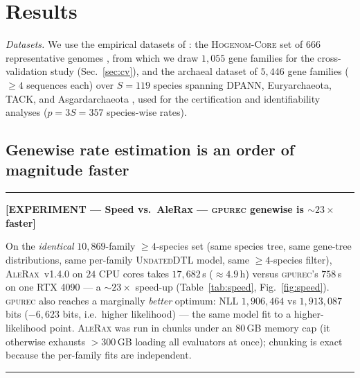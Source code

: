 \documentclass[11pt]{article}
\newcommand{\toolname}{\textsc{gpurec}\xspace}
\newenvironment{expbox}[1]{%
  \par\smallskip\noindent
  \begin{center}\begin{minipage}{0.96\linewidth}\small
  \rule{\linewidth}{0.8pt}\par
  \textbf{\color{red!60!black}[EXPERIMENT --- #1]}\par\itshape
}{%
  \par\rule{\linewidth}{0.8pt}
  \end{minipage}\end{center}\smallskip
}
\begin{document}
\section{Results}
\label{sec:results}

\noindent\emph{Datasets.} We use the empirical datasets of
\citet{Morel2024}: the \textsc{Hogenom-Core} set of $666$ representative
genomes \citep{Penel2009}, from which we draw $1{,}055$ gene families for the
cross-validation study (Sec.~\ref{sec:cv}), and the archaeal dataset of
$5{,}446$ gene families ($\geq\!4$ sequences each) over $S{=}119$ species
spanning DPANN, Euryarchaeota, TACK, and Asgardarchaeota
\citep{Williams2017,Davin2018}, used for the certification and identifiability
analyses ($p{=}3S{=}357$ species-wise rates).

\subsection{Genewise rate estimation is an order of magnitude faster}
\label{sec:speed}
\begin{expbox}{Speed vs.\ AleRax --- \toolname genewise is $\sim\!23\times$ faster}
On the \emph{identical} $10{,}869$-family $\geq\!4$-species set (same species tree, same
gene-tree distributions, same per-family \textsc{UndatedDTL} model, same $\geq\!4$-species
filter), \textsc{AleRax}~v1.4.0 on $24$ CPU cores takes $17{,}682$\,s ($\approx\!4.9$\,h)
versus \toolname's $758$\,s on one RTX 4090 --- a $\sim\!23\times$ speed-up
(Table~\ref{tab:speed}, Fig.~\ref{fig:speed}). \toolname also reaches a marginally
\emph{better} optimum: NLL $1{,}906{,}464$ vs $1{,}913{,}087$ bits ($-6{,}623$ bits, i.e.\
higher likelihood) --- the same model fit to a higher-likelihood point. \textsc{AleRax} was
run in chunks under an $80$\,GB memory cap (it otherwise exhausts $>\!300$\,GB loading all
evaluators at once); chunking is exact because the per-family fits are independent.
\end{expbox}
\end{document}

